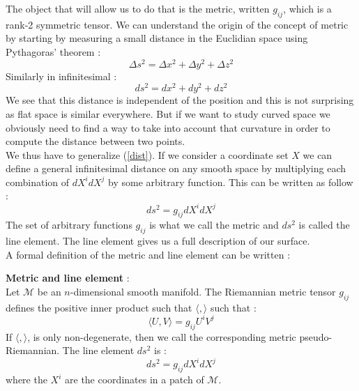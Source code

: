 \documentclass[a4paper,12pt]{article}
\theoremstyle{definition}
\begin{document}
The object that will allow us to do that is the metric, written $g_{ij}$, which is a rank-2 symmetric tensor.
We can understand the origin of the concept of metric by starting by measuring a small distance in the Euclidian space using Pythagoras' theorem :
\begin{equation}
	\Delta s^2= \Delta x^2 + \Delta y^2 + \Delta z^2
\end{equation}
Similarly in infinitesimal :
\begin{equation}\label{dist}
	ds^2= dx^2 + dy^2 + dz^2
\end{equation}
We see that this distance is independent of the position and this is not surprising as flat space is similar everywhere.
But if we want to study curved space we obviously need to find a way to take into account that curvature in order to compute the distance between two points.\\
We thus have to generalize (\ref{dist}).
If we consider a coordinate set $X$ we can define a general infinitesimal distance on any smooth space by multiplying each combination of $dX^idX^j$ by some arbitrary function.
This can be written as follow :
\begin{equation}
	ds^2=g_{ij}dX^idX^j
\end{equation}
The set of arbitrary functions $g_{ij}$ is what we call the metric and $ds^2$ is called the line element.
The line element gives us a full description of our surface.\\
A formal definition of the metric and line element can be written :
\begin{definition}
	\textbf{Metric and line element} :\\
	Let $\mathcal{M}$ be an $n$-dimensional smooth manifold.
	The Riemannian metric tensor $g_{ij}$ defines the positive inner product such that $\langle , \rangle$ such that : 
	\begin{equation}
		\langle U , V \rangle = g_{ij}U^iV^j
	\end{equation}
	If $\langle , \rangle$, is only non-degenerate, then we call the corresponding metric pseudo-Riemannian.
	The line element $ds^2$ is :
	\begin{equation}
		ds^2=g_{ij}dX^idX^j
	\end{equation}
	where the $X^i$ are the coordinates in a patch of $\mathcal{M}$.
\end{definition}
\end{document}
